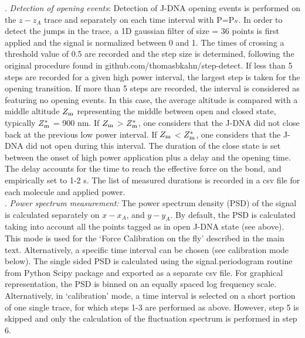 \documentclass{biophys-new}
\begin{document}
. \textit{ Detection of opening events}: Detection of J-DNA opening events is performed on the $ z - z_A$ trace and separately on each time interval with P=P$_{^H}$. In order to detect the jumps in the trace, a 1D gaussian filter of size = 36 points is first applied and the signal is normalized between 0 and 1. %
The times of crossing a threshold value of 0.5 are recorded and the step size is determined, following the original procedure found in github.com/thomasbkahn/step-detect. If less than 5 steps are recorded for a given high power interval, the largest step is taken for the opening transition. If more than 5 steps are recorded, the interval is considered as featuring no opening events. In this case, the average altitude is compared with a middle altitude $Z_{\rm m}$ representing the middle between open and closed state, typically $Z^*_{\rm m}$  = 900 nm. If $Z_{\rm m}$ > $Z^*_{\rm m}$, one considers that the J-DNA did not close back at the previous low power interval. If $Z_{\rm m}$ < $Z^*_{\rm m}$, one considers that the J-DNA did not open during this interval. %
The duration of the close state is set between the onset of high power application plus a delay and the opening time. The delay accounts for the time to reach the effective force on the bond, and empirically set to 1-2 s. The list of measured durations is recorded in a csv file for each molecule and applied power.\\

. \textit{ Power spectrum measurement:}
The power spectrum density (PSD) of the signal is calculated separately on $x - x_A$, and $y - y_A$. By default, the PSD is calculated taking into account all the points tagged as in open J-DNA state (see above). This mode is used for the ‘Force Calibration on the fly’ described in the main text. Alternatively, a specific time interval can be chosen (see calibration mode below). The single sided PSD is calculated using the signal.periodogram routine from Python Scipy package and exported as a separate csv file. For graphical representation, the PSD is binned on an equally spaced log frequency scale. %
Alternatively, in ‘calibration’ mode, a time interval is selected on a short portion of one single trace, for which steps 1-3 are performed as above. However, step 5 is skipped and only the calculation of the fluctuation spectrum is performed in step 6.\\
\end{document}
